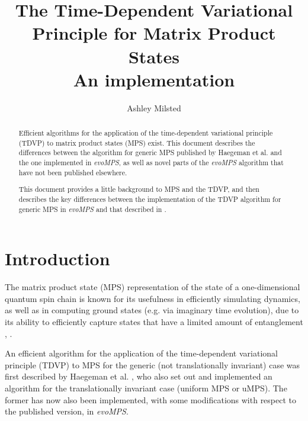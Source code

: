 \documentclass[a4paper,11pt]{article}
\title{The Time-Dependent Variational Principle for Matrix Product States\\
{\Large  An implementation}}
\author{Ashley Milsted}
\begin{document}
\maketitle

\begin{abstract}
Efficient algorithms for the application of the time-dependent variational
principle (TDVP) to matrix product states (MPS) exist. This document describes
the differences between the algorithm for generic MPS 
published by Haegeman et al. \cite{haegeman_time-dependent_2011} 
and the one implemented in \emph{evoMPS}, 
as well as novel parts of the \emph{evoMPS} algorithm that
have not been published elsewhere.

This document provides a little background to MPS and the TDVP, and then
describes the key differences between the implementation of the TDVP algorithm
for generic MPS in \emph{evoMPS} and that described in \cite{haegeman_time-dependent_2011}.
\end{abstract}

\setcounter{tocdepth}{2}
\tableofcontents

\section{Introduction}
The matrix product state (MPS) representation of the state of a one-dimensional 
quantum spin chain is known for its usefulness in efficiently simulating dynamics, 
as well as in computing ground states (e.g. via imaginary time evolution), due
to its ability to efficiently capture states that have a limited amount of
entanglement \cite{vidal_efficient_2003}, \cite{verstraete_matrix_2008}.

An efficient algorithm for the application of the time-dependent variational
principle (TDVP) to MPS for the generic (not 
translationally invariant) case was first described by Haegeman et al. 
\cite{haegeman_time-dependent_2011}, who also set out and implemented an algorithm for the
translationally invariant case (uniform MPS or uMPS). The former has now also been implemented, with some
modifications with respect to the published version, in \emph{evoMPS}.
\end{document}
